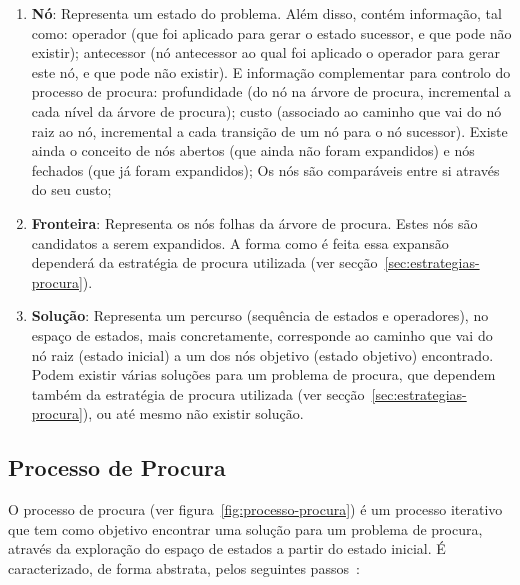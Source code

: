\begin{enumerate}
    \item \textbf{Nó}: Representa um estado do problema.
    Além disso, contém informação, tal como: operador (que foi aplicado para gerar o estado sucessor, e que pode não existir); antecessor (nó antecessor ao qual foi aplicado o operador para gerar este nó, e que pode não existir).
    E informação complementar para controlo do processo de procura: profundidade (do nó na árvore de procura, incremental a cada nível da árvore de procura); custo (associado ao caminho que vai do nó raiz ao nó, incremental a cada transição de um nó para o nó sucessor).
    Existe ainda o conceito de nós abertos (que ainda não foram expandidos) e nós fechados (que já foram expandidos);
    Os nós são comparáveis entre si através do seu custo;
    \item \textbf{Fronteira}: Representa os nós folhas da árvore de procura.
    Estes nós são candidatos a serem expandidos.
    A forma como é feita essa expansão dependerá da estratégia de procura utilizada (ver secção~\ref{sec:estrategias-procura}).
    \item \textbf{Solução}: Representa um percurso (sequência de estados e operadores), no espaço de estados, mais concretamente, corresponde ao caminho que vai do nó raiz (estado inicial) a um dos nós objetivo (estado objetivo) encontrado.
    Podem existir várias soluções para um problema de procura, que dependem também da estratégia de procura utilizada (ver secção~\ref{sec:estrategias-procura}), ou até mesmo não existir solução.
\end{enumerate}

\subsection{Processo de Procura}\label{subsec:processo-procura}

O processo de procura (ver figura~\ref{fig:processo-procura}) é um processo iterativo que tem como objetivo encontrar uma solução para um problema de procura, através da exploração do espaço de estados a partir do estado inicial.
É caracterizado, de forma abstrata, pelos seguintes passos~\cite{isel:iasa:slides:proc-espaco-estados-parte-1}:

